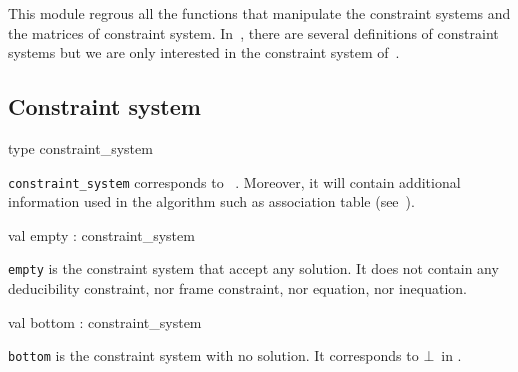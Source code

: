 \ocamldocvspace{0.5cm}



This module regrous all the functions that manipulate the constraint systems and the
    matrices of constraint system. In~\thesis, there are several definitions of constraint systems
    but we are only interested in the constraint system of~. 



\subsection{Constraint system}




\label{type:Constraint-underscoresystem.constraint-underscoresystem}\begin{ocamldoccode}
type constraint_system 
\end{ocamldoccode}
\begin{ocamldocdescription}
{\tt{constraint\_system}} corresponds to~ . Moreover, it will contain
    additional information used in the algorithm such as association table (see~). 


\end{ocamldocdescription}




\label{val:Constraint-underscoresystem.empty}\begin{ocamldoccode}
val empty : constraint_system
\end{ocamldoccode}
\begin{ocamldocdescription}
{\tt{empty}} is the constraint system that accept any solution. It does not contain any
    deducibility constraint, nor frame constraint, nor equation, nor inequation.


\end{ocamldocdescription}




\label{val:Constraint-underscoresystem.bottom}\begin{ocamldoccode}
val bottom : constraint_system
\end{ocamldoccode}
\begin{ocamldocdescription}
{\tt{bottom}} is the constraint system with no solution. It corresponds to $\bot$~in \thesis. 


\end{ocamldocdescription}




